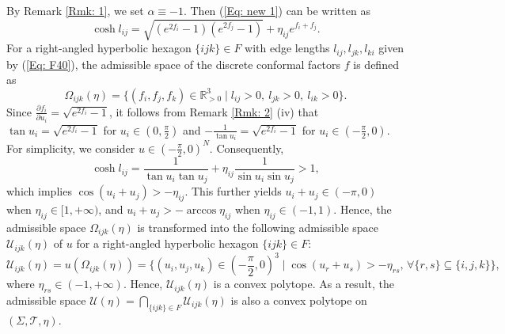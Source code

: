\documentclass[12pt]{amsart}
\theoremstyle{definition}
\begin{document}
By Remark \ref{Rmk: 1}, we set $\alpha\equiv -1$.
Then (\ref{Eq: new 1}) can be written as
\begin{equation}\label{Eq: F40}
\cosh l_{ij}=\sqrt{(e^{2f_i}-1)(e^{2f_j}-1)}
+\eta_{ij}e^{f_i+f_j}.
\end{equation}
For a right-angled hyperbolic hexagon $\{ijk\}\in F$ with edge lengths $l_{ij}, l_{jk}, l_{ki}$ given by (\ref{Eq: F40}),
the admissible space of the discrete conformal factors $f$ is defined as
\begin{equation}\label{Eq: AS_A2}
\Omega_{ijk}(\eta)=\{(f_i,f_j,f_k)\in \mathbb{R}_{> 0}^3 \mid l_{ij}>0,\  l_{jk}>0,\ l_{ik}>0\}.
\end{equation}
Since $\frac{\partial f_i}{\partial u_i}=\sqrt{e^{2f_i}-1}$,
it follows from Remark \ref{Rmk: 2} (iv) that $\tan u_i=\sqrt{e^{2f_i}-1}$ for $u_i\in (0,\frac{\pi}{2})$ and
$-\frac{1}{\tan u_i}=\sqrt{e^{2f_i}-1}$ for $u_i\in (-\frac{\pi}{2},0)$.
For simplicity, we consider $u\in (-\frac{\pi}{2},0)^N$.
Consequently,
\begin{equation}\label{Eq: F51}
\cosh l_{ij}=\frac{1}{\tan u_i\tan u_j}
+\eta_{ij}\frac{1}{\sin u_i\sin u_j}>1,
\end{equation}
which implies $\cos (u_i+u_j)>-\eta_{ij}$.
This further yields $u_i+u_j\in (-\pi,0)$ when $\eta_{ij}\in [1,+\infty)$, and
$u_i+u_j>-\arccos \eta_{ij}$ when $\eta_{ij}\in (-1,1)$.
Hence, the admissible space $\Omega_{ijk}(\eta)$ is transformed into the following admissible space $\mathcal{U}_{ijk}(\eta)$ of $u$ for a right-angled hyperbolic hexagon $\{ijk\}\in F$:
\begin{equation}\label{Eq: F13}
\mathcal{U}_{ijk}(\eta)=u(\Omega_{ijk}(\eta))
=\{(u_i,u_j,u_k)\in (-\frac{\pi}{2},0)^3 \mid \cos (u_r+u_s)>-\eta_{rs}, \, \forall\{r,s\}\subseteq\{i,j,k\} \},
\end{equation}
where $\eta_{rs}\in (-1,+\infty)$.
Hence, $\mathcal{U}_{ijk}(\eta)$ is a convex polytope.
As a result, the admissible space $\mathcal{U}(\eta)=\bigcap_{\{ijk\}\in F}\mathcal{U}_{ijk}(\eta)$ is also a convex polytope on $(\Sigma,\mathcal{T},\eta)$.
\end{document}
